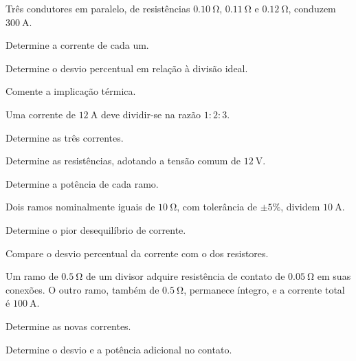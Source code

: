\blocoaprofundamento
\begin{questao}[3]{}

Três condutores em paralelo, de resistências $\SI{0.10}{\ohm}$,
$\SI{0.11}{\ohm}$ e $\SI{0.12}{\ohm}$, conduzem $\SI{300}{\ampere}$.
\begin{itensq}
\item Determine a corrente de cada um.
\item Determine o desvio percentual em relação à divisão ideal.
\item Comente a implicação térmica.
\end{itensq}


\end{questao}
\begin{questao}[3]{}

Uma corrente de $\SI{12}{\ampere}$ deve dividir-se na razão $1{:}2{:}3$.
\begin{itensq}
\item Determine as três correntes.
\item Determine as resistências, adotando a tensão comum de
      $\SI{12}{\volt}$.
\item Determine a potência de cada ramo.
\end{itensq}


\end{questao}
\begin{questao}[3]{}

Dois ramos nominalmente iguais de $\SI{10}{\ohm}$, com tolerância de
$\pm5\%$, dividem $\SI{10}{\ampere}$.
\begin{itensq}
\item Determine o pior desequilíbrio de corrente.
\item Compare o desvio percentual da corrente com o dos resistores.
\end{itensq}


\end{questao}
\begin{questao}[3]{}

Um ramo de $\SI{0.5}{\ohm}$ de um divisor adquire resistência de contato de
$\SI{0.05}{\ohm}$ em suas conexões. O outro ramo, também de
$\SI{0.5}{\ohm}$, permanece íntegro, e a corrente total é
$\SI{100}{\ampere}$.
\begin{itensq}
\item Determine as novas correntes.
\item Determine o desvio e a potência adicional no contato.
\end{itensq}


\end{questao}

